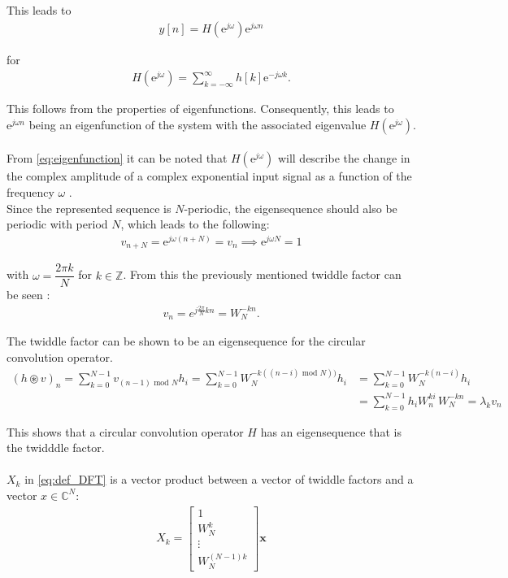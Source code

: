 This leads to
\begin{align}\label{eq:eigenfunction}
y[n] = H(\text{e}^{j \omega}) \text{e}^{j\omega n}
\end{align}

for
\begin{align*}
H(\text{e}^{j\omega}) = \sum_{k=-\infty}^{\infty} h[k]\text{e}^{-j\omega k}.
\end{align*}

This follows from the properties of eigenfunctions. Consequently, this leads to $\text{e}^{j\omega n}$ being an eigenfunction of the system with the associated eigenvalue $H(\text{e}^{j\omega})$.
\\\\
From \eqref{eq:eigenfunction} it can be noted that $H(\text{e}^{j\omega})$ will describe the change in the complex amplitude of a complex exponential input signal as a function of the frequency $\omega$ \cite{DTSP}. 
\\
Since the represented sequence is $N$-periodic, the eigensequence should also be periodic with period $N$, which leads to the following:
\begin{align*}
v_{n+N} = \text{e}^{j\omega (n+N)} = v_n \implies \text{e}^{j\omega N} = 1
\end{align*}

with $\omega = \dfrac{2 \pi k}{N}$ for $k \in \mathbb{Z}$. From this the previously mentioned twiddle factor can be seen \cite{FSP}:
\begin{align*}
v_n = e^{j\frac{2\pi}{N} kn} = W_N^{-kn}.
\end{align*}

The twiddle factor can be shown to be an eigensequence for the circular convolution operator.
\begin{align*}
	(h\circledast v)_n 
	= \sum_{k=0}^{N-1} v_{(n-1)\text{ mod }N}h_i 
	= \sum_{k=0}^{N-1} W_N^{-k((n-i) \text{ mod } N))}h_i
	&= \sum_{k=0}^{N-1} W_N^{-k(n-i)}h_i\\
	&= \sum_{k=0}^{N-1} h_i W_n^{ki} \, W_N^{-kn}
	= \lambda_k v_n
\end{align*}

This shows that a circular convolution operator $H$ has an eigensequence that is the twidddle factor.
\\\\  
$X_k$ in \eqref{eq:def_DFT} is a vector product between a vector of twiddle factors and a vector $x \in \mathbb{C}^N$:
\begin{align*}
	X_k =
	\begin{bmatrix}
		1 \\	W_N^k \\	\vdots \\ W_N^{(N-1)k}
	\end{bmatrix}
	\textbf{x}
\end{align*}


